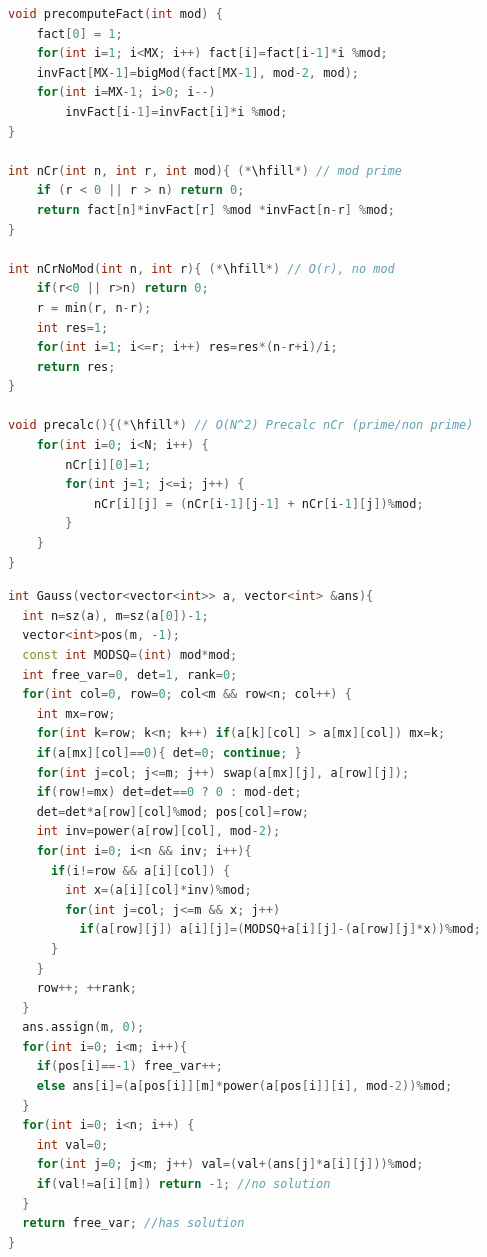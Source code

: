 \begin{lstlisting}[language=C++]
void precomputeFact(int mod) {
    fact[0] = 1;
    for(int i=1; i<MX; i++) fact[i]=fact[i-1]*i %mod;
    invFact[MX-1]=bigMod(fact[MX-1], mod-2, mod);
    for(int i=MX-1; i>0; i--) 
    	invFact[i-1]=invFact[i]*i %mod;
}

int nCr(int n, int r, int mod){ (*\hfill*) // mod prime
    if (r < 0 || r > n) return 0;
    return fact[n]*invFact[r] %mod *invFact[n-r] %mod;
}

int nCrNoMod(int n, int r){ (*\hfill*) // O(r), no mod
    if(r<0 || r>n) return 0;
    r = min(r, n-r);
    int res=1;
    for(int i=1; i<=r; i++) res=res*(n-r+i)/i;
    return res;
}

void precalc(){(*\hfill*) // O(N^2) Precalc nCr (prime/non prime)
    for(int i=0; i<N; i++) {
        nCr[i][0]=1; 
        for(int j=1; j<=i; j++) {
            nCr[i][j] = (nCr[i-1][j-1] + nCr[i-1][j])%mod;
        }
    }
}
\end{lstlisting}

\begin{lstlisting}[language=C++]
int Gauss(vector<vector<int>> a, vector<int> &ans){
  int n=sz(a), m=sz(a[0])-1;
  vector<int>pos(m, -1);
  const int MODSQ=(int) mod*mod;
  int free_var=0, det=1, rank=0;
  for(int col=0, row=0; col<m && row<n; col++) {
    int mx=row;
    for(int k=row; k<n; k++) if(a[k][col] > a[mx][col]) mx=k;
    if(a[mx][col]==0){ det=0; continue; }
    for(int j=col; j<=m; j++) swap(a[mx][j], a[row][j]);
    if(row!=mx) det=det==0 ? 0 : mod-det;
    det=det*a[row][col]%mod; pos[col]=row;
    int inv=power(a[row][col], mod-2);
    for(int i=0; i<n && inv; i++){
      if(i!=row && a[i][col]) {
        int x=(a[i][col]*inv)%mod;
        for(int j=col; j<=m && x; j++)
          if(a[row][j]) a[i][j]=(MODSQ+a[i][j]-(a[row][j]*x))%mod;
      }
    }
    row++; ++rank;
  }
  ans.assign(m, 0);
  for(int i=0; i<m; i++){
    if(pos[i]==-1) free_var++;
    else ans[i]=(a[pos[i]][m]*power(a[pos[i]][i], mod-2))%mod;
  }
  for(int i=0; i<n; i++) {
    int val=0;
    for(int j=0; j<m; j++) val=(val+(ans[j]*a[i][j]))%mod;
    if(val!=a[i][m]) return -1; //no solution
  }
  return free_var; //has solution
}
\end{lstlisting}
